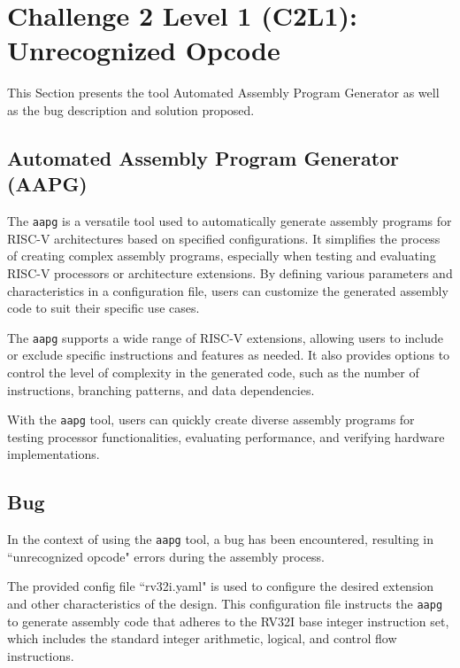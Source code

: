 \section{Challenge 2 Level 1 (C2L1): Unrecognized Opcode}

This Section presents the tool Automated Assembly Program Generator as well as the bug description and solution proposed.

\subsection{Automated Assembly Program Generator (AAPG)}

The \texttt{aapg} is a versatile tool used to automatically generate assembly programs for RISC-V architectures based on specified configurations. It simplifies the process of creating complex assembly programs, especially when testing and evaluating RISC-V processors or architecture extensions. By defining various parameters and characteristics in a configuration file, users can customize the generated assembly code to suit their specific use cases.

The \texttt{aapg} supports a wide range of RISC-V extensions, allowing users to include or exclude specific instructions and features as needed. It also provides options to control the level of complexity in the generated code, such as the number of instructions, branching patterns, and data dependencies.

With the \texttt{aapg} tool, users can quickly create diverse assembly programs for testing processor functionalities, evaluating performance, and verifying hardware implementations.

\subsection{Bug}

In the context of using the \texttt{aapg} tool, a bug has been encountered, resulting in ``unrecognized opcode" errors during the assembly process.

The provided config file ``rv32i.yaml" is used to configure the desired extension and other characteristics of the design. This configuration file instructs the \texttt{aapg} to generate assembly code that adheres to the RV32I base integer instruction set, which includes the standard integer arithmetic, logical, and control flow instructions.

